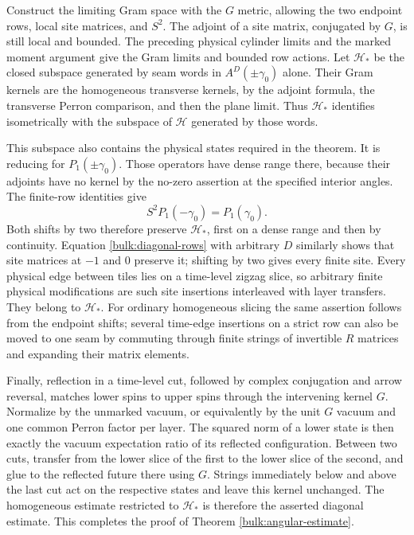 Construct the limiting Gram space with the $G$ metric, allowing
the two endpoint rows, local site matrices, and $S^2$.
The adjoint of a site matrix, conjugated by $G$, is still local
and bounded. The preceding physical cylinder limits and the
marked moment argument give the Gram limits and bounded row
actions. Let $\mathcal H_*$ be the closed subspace generated
by seam words in $A^D(\pm\gamma_0)$ alone. Their Gram kernels
are the homogeneous transverse kernels, by the adjoint formula,
the transverse Perron comparison, and then the plane limit.
Thus $\mathcal H_*$ identifies isometrically with the subspace
of $\mathcal H$ generated by those words.

This subspace also contains the physical states required in
the theorem. It is reducing for $P_1(\pm\gamma_0)$. Those
operators have dense range there, because their adjoints have
no kernel by the no-zero assertion at the specified interior
angles. The finite-row identities give
\[
 S^2P_1(-\gamma_0)=P_1(\gamma_0).
\]
Both shifts by two therefore preserve $\mathcal H_*$, first
on a dense range and then by continuity. Equation
\eqref{bulk:diagonal-rows} with arbitrary $D$ similarly shows
that site matrices at $-1$ and $0$ preserve it; shifting by two
gives every finite site. Every physical edge between tiles
lies on a time-level zigzag slice, so arbitrary finite physical
modifications are such site insertions interleaved with layer
transfers. They belong to $\mathcal H_*$. For ordinary
homogeneous slicing the same assertion follows from the
endpoint shifts; several time-edge insertions on a strict
row can also be moved to one seam by commuting through finite
strings of invertible $R$ matrices and expanding their matrix
elements.

Finally, reflection in a time-level cut, followed by complex
conjugation and arrow reversal, matches lower spins to upper
spins through the intervening kernel $G$. Normalize by the
unmarked vacuum, or equivalently by the unit $G$ vacuum and
one common Perron factor per layer. The squared norm of a
lower state is then exactly the vacuum expectation ratio
of its reflected configuration. Between two cuts, transfer
from the lower slice of the first to the lower slice of
the second, and glue to the reflected future there using
$G$. Strings immediately below and above the last cut act
on the respective states and leave this kernel unchanged.
The homogeneous estimate restricted to $\mathcal H_*$ is
therefore the asserted diagonal estimate. This completes the
proof of Theorem \ref{bulk:angular-estimate}.

